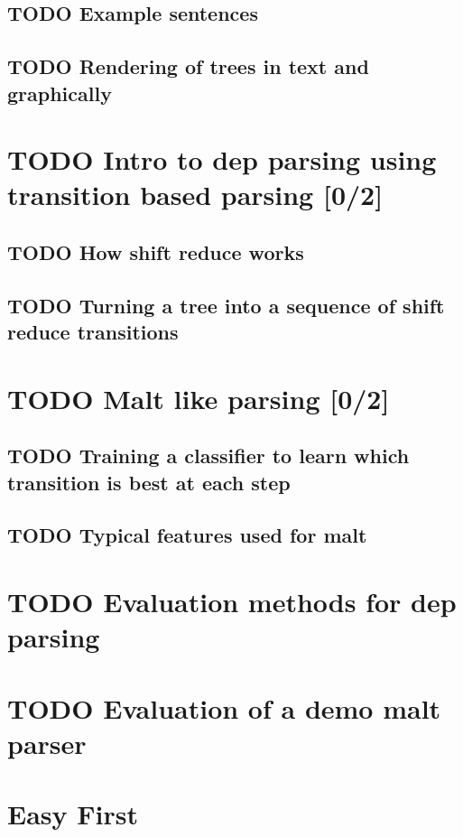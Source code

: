 \documentclass[11pt]{article}
\begin{document}
\subsection{\textbf{TODO} Example sentences}
\label{sec-2-2}
\subsection{\textbf{TODO} Rendering of trees in text and graphically}
\label{sec-2-3}
\section{\textbf{TODO} Intro to dep parsing using transition based parsing [0/2]}
\label{sec-3}
\subsection{\textbf{TODO} How shift reduce works}
\label{sec-3-1}
\subsection{\textbf{TODO} Turning a tree into a sequence of shift reduce transitions}
\label{sec-3-2}
\section{\textbf{TODO} Malt like parsing [0/2]}
\label{sec-4}
\subsection{\textbf{TODO} Training a classifier to learn which transition is best at each step}
\label{sec-4-1}
\subsection{\textbf{TODO} Typical features used for malt}
\label{sec-4-2}
\section{\textbf{TODO} Evaluation methods for dep parsing}
\label{sec-5}
\section{\textbf{TODO} Evaluation of a demo malt parser}
\label{sec-6}
\section{Easy First}
\label{sec-7}
\end{document}
